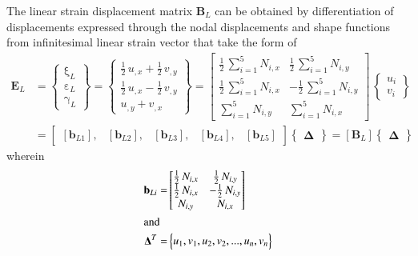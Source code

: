 The linear strain displacement matrix $\mathbf{B}_L$ can be obtained by differentiation of displacements expressed through the nodal displacements and shape functions from infinitesimal linear strain vector that take the form of
\begin{equation}
\begin{aligned}
\mathbf{E}_L & =  \begin{Bmatrix}
\mathrm \xi_{L} \\
\mathrm \varepsilon_{L} \\
\mathrm \gamma_{L} \end{Bmatrix} = 
\begin{Bmatrix}
\tfrac{1}{2} \, u_{,x} +   \tfrac{1}{2} \, v_{,y} \\
\tfrac{1}{2} \, u_{,x} - \tfrac{1}{2} \, v_{,y} \\
u_{,y} + v_{,x} \end{Bmatrix} = \begin{bmatrix}
\tfrac{1}{2} \, \sum\nolimits_{i=1}^5 N_{i,x}  & \tfrac{1}{2} \, \sum\nolimits_{i=1}^5 N_{i,y}  \\
\tfrac{1}{2} \, \sum\nolimits_{i=1}^5 N_{i,x}  & -\tfrac{1}{2} \, \sum\nolimits_{i=1}^5 N_{i,y}  \\ \sum\nolimits_{i=1}^5 N_{i,y}  & \sum\nolimits_{i=1}^5 N_{i,x}  \end{bmatrix} \, \begin{Bmatrix}
u_{i} \\
v_{i} \end{Bmatrix} \\
& = \begin{bmatrix}
[\mathbf{b}_{L1}], & [\mathbf{b}_{L2}], & [\mathbf{b}_{L3}], & [\mathbf{b}_{L4}], & [\mathbf{b}_{L5}] 
\end{bmatrix}  \begin{Bmatrix} \boldsymbol{\Delta} \end{Bmatrix}  
= [\mathbf{B}_L] \begin{Bmatrix} \boldsymbol{\Delta} \end{Bmatrix} 
\end{aligned}
\end{equation}
wherein 
\begin{subequations}
	\begin{align}
	\mathbf{b}_{Li} = & \begin{bmatrix}
	\tfrac{1}{2} \, N_{i,x}  &  \tfrac{1}{2} \, N_{i,y} \\
	\tfrac{1}{2} \, N_{i,x}  & - \tfrac{1}{2} \, N_{i,y} \\
	N_{i,y} & N_{i,x}  \end{bmatrix}\\
	\intertext{and}
	\mathbf{\Delta}^T  = &
	\begin{Bmatrix}
	u_1, v_1, u_2, v_2, ...,u_n, v_n
	\end{Bmatrix}
	\end{align}
\end{subequations}

